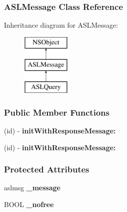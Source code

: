\hypertarget{interface_a_s_l_message}{
\subsubsection{ASLMessage Class Reference}
\label{interface_a_s_l_message}
}
Inheritance diagram for ASLMessage:\begin{figure}[h]
\begin{center}
\leavevmode
\includegraphics[height=3.000000cm]{interface_a_s_l_message}
\end{center}
\end{figure}
\subsubsection*{Public Member Functions}
\begin{DoxyCompactItemize}
\item 
\hypertarget{interface_a_s_l_message_af1fd9ddce79ddc29d6018af33b8155c9}{
(id) -\/ {\bfseries initWithResponseMessage:}}
\label{interface_a_s_l_message_af1fd9ddce79ddc29d6018af33b8155c9}

\item 
\hypertarget{interface_a_s_l_message_af1fd9ddce79ddc29d6018af33b8155c9}{
(id) -\/ {\bfseries initWithResponseMessage:}}
\label{interface_a_s_l_message_af1fd9ddce79ddc29d6018af33b8155c9}

\end{DoxyCompactItemize}
\subsubsection*{Protected Attributes}
\begin{DoxyCompactItemize}
\item 
\hypertarget{interface_a_s_l_message_a981d33257745333c366c5a2ff079c958}{
aslmsg {\bfseries \_\-message}}
\label{interface_a_s_l_message_a981d33257745333c366c5a2ff079c958}

\item 
\hypertarget{interface_a_s_l_message_a9bbd0a1f0d0b6b00498df87fa671ca9a}{
BOOL {\bfseries \_\-nofree}}
\label{interface_a_s_l_message_a9bbd0a1f0d0b6b00498df87fa671ca9a}

\end{DoxyCompactItemize}
